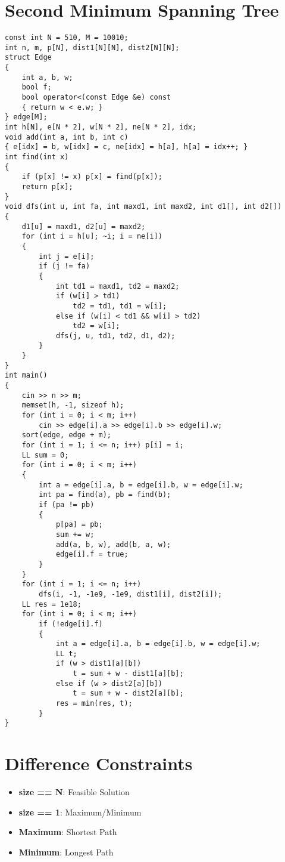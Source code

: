 \section{Second Minimum Spanning Tree}
\begin{lstlisting}
const int N = 510, M = 10010;
int n, m, p[N], dist1[N][N], dist2[N][N];
struct Edge
{
    int a, b, w;
    bool f;
    bool operator<(const Edge &e) const 
    { return w < e.w; }
} edge[M];
int h[N], e[N * 2], w[N * 2], ne[N * 2], idx;
void add(int a, int b, int c)
{ e[idx] = b, w[idx] = c, ne[idx] = h[a], h[a] = idx++; }
int find(int x)
{
    if (p[x] != x) p[x] = find(p[x]);
    return p[x];
}
void dfs(int u, int fa, int maxd1, int maxd2, int d1[], int d2[])
{
    d1[u] = maxd1, d2[u] = maxd2;
    for (int i = h[u]; ~i; i = ne[i])
    {
        int j = e[i];
        if (j != fa)
        {
            int td1 = maxd1, td2 = maxd2;
            if (w[i] > td1)
                td2 = td1, td1 = w[i];
            else if (w[i] < td1 && w[i] > td2)
                td2 = w[i];
            dfs(j, u, td1, td2, d1, d2);
        }
    }
}
int main()
{
    cin >> n >> m;
    memset(h, -1, sizeof h);
    for (int i = 0; i < m; i++)
        cin >> edge[i].a >> edge[i].b >> edge[i].w;
    sort(edge, edge + m);
    for (int i = 1; i <= n; i++) p[i] = i;
    LL sum = 0;
    for (int i = 0; i < m; i++)
    {
        int a = edge[i].a, b = edge[i].b, w = edge[i].w;
        int pa = find(a), pb = find(b);
        if (pa != pb)
        {
            p[pa] = pb;
            sum += w;
            add(a, b, w), add(b, a, w);
            edge[i].f = true;
        }
    }
    for (int i = 1; i <= n; i++)
        dfs(i, -1, -1e9, -1e9, dist1[i], dist2[i]);
    LL res = 1e18;
    for (int i = 0; i < m; i++)
        if (!edge[i].f)
        {
            int a = edge[i].a, b = edge[i].b, w = edge[i].w;
            LL t;
            if (w > dist1[a][b])
                t = sum + w - dist1[a][b];
            else if (w > dist2[a][b])
                t = sum + w - dist2[a][b];
            res = min(res, t);
        }
}
\end{lstlisting}
\section{Difference Constraints}
\begin{itemize}
    \item \textbf{size == N}: Feasible Solution
    \item \textbf{size == 1}: Maximum/Minimum
    \item \textbf{Maximum}: Shortest Path
    \item \textbf{Minimum}: Longest Path
\end{itemize}

